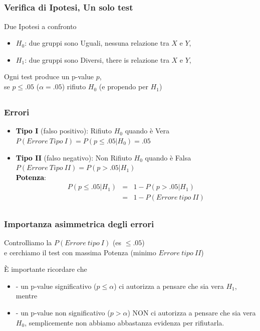 \documentclass[xcolor={pdftex,dvipsnames,table}]{beamer}
\newcommand{\bbf}[1]{\textcolor{black}{\bf #1}}
\newcommand{\rbf}[1]{\textcolor{redUnipd}{ #1}}
\newcommand{\bi}{\begin {itemize}}
\newcommand{\ei}{\end{itemize}}
\begin{document}
\subsection{}
\begin{frame}
\frametitle{Verifica di Ipotesi, Un solo test}

\rbf{Due Ipotesi a confronto}

\begin{itemize}
\item $H_0$: due gruppi sono Uguali, nessuna relazione tra $X$ e $Y$, 
\item $H_1$: due gruppi sono Diversi, there is relazione tra $X$ e $Y$,
\end{itemize}
Ogni test produce un p-value $p$, \\  se $p\leq .05$ ($\alpha=.05$) rifiuto $H_0$ (e propendo per $H_1$)
\end{frame}

\subsection{}
\begin{frame}
\frametitle{Errori}

\begin{itemize}
\item \bbf{Tipo I} (falso positivo): Rifiuto $H_0$ quando \`e Vera \\
$P(Errore\ Tipo\ I)=P(p\leq .05 | H_0)=.05$
\item \bbf{Tipo II} (falso negativo): Non Rifiuto $H_0$ quando \`e Falsa \\
$P(Errore\ Tipo\ II)=P(p> .05 | H_1)$\\
\bbf{Potenza}: 
\begin{eqnarray}\nonumber P(p\leq .05 | H_1)&=& 1-P(p>.05 | H_1)\\ \nonumber &=& 1-P(Errore\ tipo\ II) 
\end{eqnarray}
\end{itemize}
\end{frame}

\subsection{}
\begin{frame}
\frametitle{Importanza asimmetrica degli errori}

Controlliamo la $P(Errore\ tipo\ I)$ (es $\leq .05$)\\
e cerchiamo il test con massima Potenza (minimo $Errore\ tipo\ II$)
\bigskip

\`E importante ricordare che
\bi
\item[-] un p-value significativo ($p\leq\alpha$) ci autorizza a pensare che sia vera $H_1$, mentre
\item[-] un p-value non significativo ($p>\alpha$) NON ci autorizza a pensare che sia vera $H_0$, semplicemente non abbiamo abbastanza evidenza per rifiutarla.
\ei
\end{frame}
\end{document}
